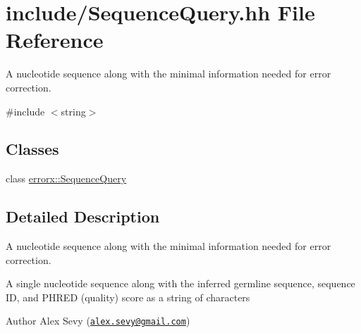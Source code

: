 \hypertarget{_sequence_query_8hh}{}\section{include/\+Sequence\+Query.hh File Reference}
\label{_sequence_query_8hh}


A nucleotide sequence along with the minimal information needed for error correction.  


{\ttfamily \#include $<$string$>$}\newline
\subsection*{Classes}
\begin{DoxyCompactItemize}
\item 
class \mbox{\hyperlink{classerrorx_1_1_sequence_query}{errorx\+::\+Sequence\+Query}}
\end{DoxyCompactItemize}


\subsection{Detailed Description}
A nucleotide sequence along with the minimal information needed for error correction. 

A single nucleotide sequence along with the inferred germline sequence, sequence ID, and P\+H\+R\+ED (quality) score as a string of characters \begin{DoxyAuthor}{Author}
Alex Sevy (\href{mailto:alex.sevy@gmail.com}{\tt alex.\+sevy@gmail.\+com}) 
\end{DoxyAuthor}
